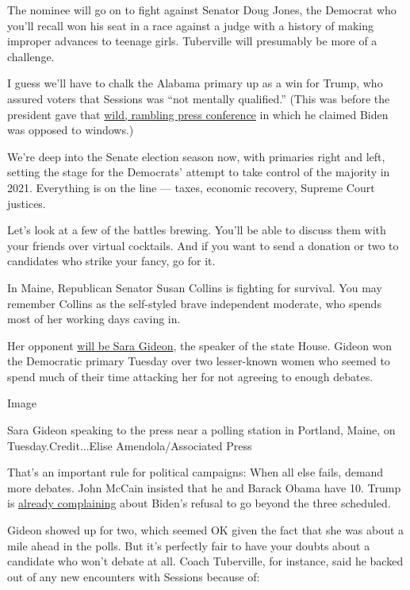 The nominee will go on to fight against Senator Doug Jones, the Democrat
who you'll recall won his seat in a race against a judge with a history
of making improper advances to teenage girls. Tuberville will presumably
be more of a challenge.

I guess we'll have to chalk the Alabama primary up as a win for Trump,
who assured voters that Sessions was ``not mentally qualified.'' (This
was before the president gave that
\href{https://www.nytimes3xbfgragh.onion/2020/07/14/us/politics/trump-news-conference.html}{wild,
rambling press conference} in which he claimed Biden was opposed to
windows.)

We're deep into the Senate election season now, with primaries right and
left, setting the stage for the Democrats' attempt to take control of
the majority in 2021. Everything is on the line --- taxes, economic
recovery, Supreme Court justices.

Let's look at a few of the battles brewing. You'll be able to discuss
them with your friends over virtual cocktails. And if you want to send a
donation or two to candidates who strike your fancy, go for it.

In Maine, Republican Senator Susan Collins is fighting for survival. You
may remember Collins as the self-styled brave independent moderate, who
spends most of her working days caving in.

Her opponent
\href{https://www.nytimes3xbfgragh.onion/2020/07/14/us/politics/sara-gideon-maine.html}{will
be Sara Gideon}, the speaker of the state House. Gideon won the
Democratic primary Tuesday over two lesser-known women who seemed to
spend much of their time attacking her for not agreeing to enough
debates.

Image

Sara Gideon speaking to the press near a polling station in Portland,
Maine, on Tuesday.Credit...Elise Amendola/Associated Press

That's an important rule for political campaigns: When all else fails,
demand more debates. John McCain insisted that he and Barack Obama have
10. Trump is
\href{https://www.politico.com/news/2020/06/18/trump-joe-biden-debates-328356}{already
complaining} about Biden's refusal to go beyond the three scheduled.

Gideon showed up for two, which seemed OK given the fact that she was
about a mile ahead in the polls. But it's perfectly fair to have your
doubts about a candidate who won't debate at all. Coach Tuberville, for
instance, said he backed out of any new encounters with Sessions because
of:

